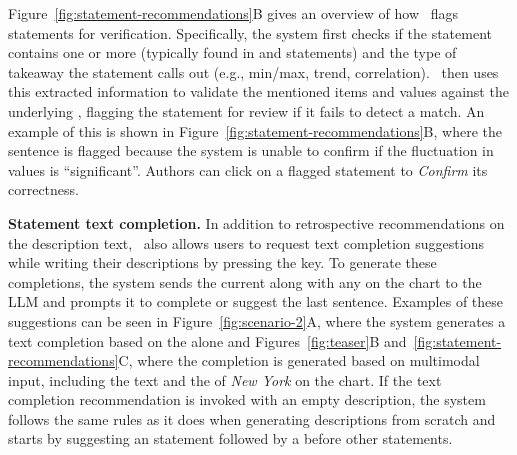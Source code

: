 {Figure~\ref{fig:statement-recommendations}B gives an overview of how \pluto~flags statements for verification.
Specifically, the system first checks if the statement contains one or more  (typically found in  and  statements) and the type of takeaway the statement calls out (e.g., min/max, trend, correlation).
\pluto~then uses this extracted information to validate the mentioned items and values against the underlying , flagging the statement for review if it fails to detect a match.
An example of this is shown in Figure~\ref{fig:statement-recommendations}B, where the sentence is flagged because the system is unable to confirm if the fluctuation in values is ``significant''.
Authors can click on a flagged statement to {\small{}} \textit{Confirm} its correctness.

\textbf{Statement text completion.}
In addition to retrospective recommendations on the description text, \pluto~also allows users to request text completion suggestions while writing their descriptions by pressing the  key.
To generate these completions, the system sends the current  along with any  on the chart to the LLM and prompts it to complete or suggest the last sentence.
Examples of these suggestions can be seen in Figure~\ref{fig:scenario-2}A, where the system generates a text completion based on the  alone and Figures~\ref{fig:teaser}B and~\ref{fig:statement-recommendations}C, where the completion is generated based on multimodal input, including the  text and the  of \textit{New York} on the chart.
If the text completion recommendation is invoked with an empty description, the system follows the same rules as it does when generating descriptions from scratch and starts by suggesting an  statement followed by a  before other statements.

\vspace{.5em}
\vspace{.5em}

}
